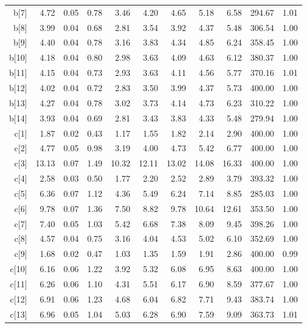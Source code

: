 \begin{longtable}{rrrrrrrrrrr}
  b[7] & 4.72 & 0.05 & 0.78 & 3.46 & 4.20 & 4.65 & 5.18 & 6.58 & 294.67 & 1.01 \\ 
  b[8] & 3.99 & 0.04 & 0.68 & 2.81 & 3.54 & 3.92 & 4.37 & 5.48 & 306.54 & 1.00 \\ 
  b[9] & 4.40 & 0.04 & 0.78 & 3.16 & 3.83 & 4.34 & 4.85 & 6.24 & 358.45 & 1.00 \\ 
  b[10] & 4.18 & 0.04 & 0.80 & 2.98 & 3.63 & 4.09 & 4.63 & 6.12 & 380.37 & 1.00 \\ 
  b[11] & 4.15 & 0.04 & 0.73 & 2.93 & 3.63 & 4.11 & 4.56 & 5.77 & 370.16 & 1.01 \\ 
  b[12] & 4.02 & 0.04 & 0.72 & 2.83 & 3.50 & 3.99 & 4.37 & 5.73 & 400.00 & 1.00 \\ 
  b[13] & 4.27 & 0.04 & 0.78 & 3.02 & 3.73 & 4.14 & 4.73 & 6.23 & 310.22 & 1.00 \\ 
  b[14] & 3.93 & 0.04 & 0.69 & 2.81 & 3.43 & 3.83 & 4.33 & 5.48 & 279.94 & 1.00 \\ 
  c[1] & 1.87 & 0.02 & 0.43 & 1.17 & 1.55 & 1.82 & 2.14 & 2.90 & 400.00 & 1.00 \\ 
  c[2] & 4.77 & 0.05 & 0.98 & 3.19 & 4.00 & 4.73 & 5.42 & 6.77 & 400.00 & 1.00 \\ 
  c[3] & 13.13 & 0.07 & 1.49 & 10.32 & 12.11 & 13.02 & 14.08 & 16.33 & 400.00 & 1.00 \\ 
  c[4] & 2.58 & 0.03 & 0.50 & 1.77 & 2.20 & 2.52 & 2.89 & 3.79 & 393.32 & 1.00 \\ 
  c[5] & 6.36 & 0.07 & 1.12 & 4.36 & 5.49 & 6.24 & 7.14 & 8.85 & 285.03 & 1.00 \\ 
  c[6] & 9.78 & 0.07 & 1.36 & 7.50 & 8.82 & 9.78 & 10.64 & 12.61 & 353.50 & 1.00 \\ 
  c[7] & 7.40 & 0.05 & 1.03 & 5.42 & 6.68 & 7.38 & 8.09 & 9.45 & 398.26 & 1.00 \\ 
  c[8] & 4.57 & 0.04 & 0.75 & 3.16 & 4.04 & 4.53 & 5.02 & 6.10 & 352.69 & 1.00 \\ 
  c[9] & 1.68 & 0.02 & 0.47 & 1.03 & 1.35 & 1.59 & 1.91 & 2.86 & 400.00 & 0.99 \\ 
  c[10] & 6.16 & 0.06 & 1.22 & 3.92 & 5.32 & 6.08 & 6.95 & 8.63 & 400.00 & 1.00 \\ 
  c[11] & 6.26 & 0.06 & 1.10 & 4.31 & 5.51 & 6.17 & 6.90 & 8.59 & 377.67 & 1.00 \\ 
  c[12] & 6.91 & 0.06 & 1.23 & 4.68 & 6.04 & 6.82 & 7.71 & 9.43 & 383.74 & 1.00 \\ 
  c[13] & 6.96 & 0.05 & 1.04 & 5.03 & 6.28 & 6.90 & 7.59 & 9.09 & 363.73 & 1.01 \\ 

\end{longtable}
